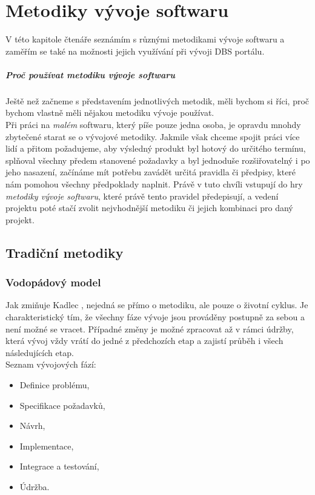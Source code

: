 \chapter{Metodiky vývoje softwaru} \label{methods}

V této kapitole čtenáře seznámím s různými metodikami vývoje softwaru a zaměřím se také na možnosti jejich využívání při vývoji DBS portálu.

\paragraph{Proč používat metodiku vývoje softwaru}
Ještě než začneme s představením jednotlivých metodik, měli bychom si říci, proč bychom vlastně měli nějakou metodiku vývoje používat.\\
Při práci na \emph{malém} softwaru, který píše pouze jedna osoba, je opravdu mnohdy zbytečené starat se o vývojové metodiky. Jakmile však chceme spojit práci více lidí a přitom požadujeme, aby výsledný produkt byl hotový do určitého termínu, splňoval všechny předem stanovené požadavky a byl jednoduše rozšiřovatelný i po jeho nasazení, začínáme mít potřebu zavádět určitá pravidla či předpisy, které nám pomohou všechny předpoklady naplnit. Právě v tuto chvíli vstupují do hry \emph{metodiky vývoje softwaru}, které právě tento  pravidel předepisují, a vedení projektu poté stačí zvolit nejvhodnější metodiku či jejich kombinaci pro daný projekt.

\section{Tradiční metodiky} \label{methods:traditional}

\subsection{Vodopádový model} \label{methods:waterfall}

Jak zmiňuje Kadlec \cite{kadlec}, nejedná se přímo o metodiku, ale pouze o životní cyklus. Je charakteristický tím, že všechny fáze vývoje jsou prováděny postupně za sebou a není možné se vracet. Případné změny je možné zpracovat až v rámci údržby, která vývoj vždy vrátí do jedné z předchozích etap a zajistí průběh i všech následujících etap.\\
Seznam vývojových fází:
\begin{itemize}
	\item Definice problému,
	\item Specifikace požadavků,
	\item Návrh,
	\item Implementace,
	\item Integrace a testování,
	\item Údržba.
\end{itemize}

